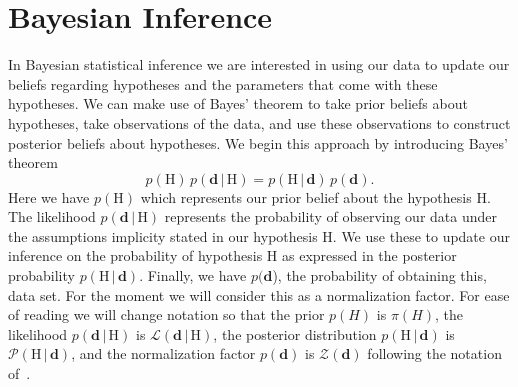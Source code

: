 \section{Bayesian Inference}\label{sec:bayes_inf}
In Bayesian statistical inference we are interested in using our data to update our beliefs regarding hypotheses and the parameters that come with these hypotheses. We can make use of Bayes' theorem to take prior beliefs about hypotheses, take observations of the data, and use these observations to construct posterior beliefs about hypotheses. We begin this approach by introducing Bayes' theorem
\begin{equation} \label{eqn:BayesTheorem_basic}
     p(\mathrm{H}) \, p(\mathbf{d} \, |\, \mathrm{H})  =  p(\mathrm{H} \, | \, \mathbf{d}) \, p(\mathbf{d}).
\end{equation}
Here we have $p(\mathrm{H})$ which represents our prior belief about the hypothesis H. The likelihood $p(\mathbf{d} \, |\, \mathrm{H})$ represents the probability of observing our data under the assumptions implicity stated in our hypothesis H. We use these to update our inference on the probability of hypothesis H as expressed in the posterior probability $p(\mathrm{H} \, | \, \mathbf{d})$. Finally, we have $p(\mathbf{d}$), the probability of obtaining this, data set. For the moment we will consider this as a normalization factor. For ease of reading we will change notation so that the prior $p(H)$ is $\pi (H)$, the likelihood $p(\mathbf{d} \, |\, \mathrm{H})$ is $\mathcal{L}(\mathbf{d} \, | \, \mathrm{H})$, the posterior distribution $p(\mathrm{H} \, | \, \mathbf{d})$ is $\mathcal{P}(\mathrm{H} \, | \, \mathbf{d})$, and the normalization factor $p(\mathbf{d})$ is $\mathcal{Z}(\mathbf{d})$ following the notation of~\cite{hobson2010bayesian}.

